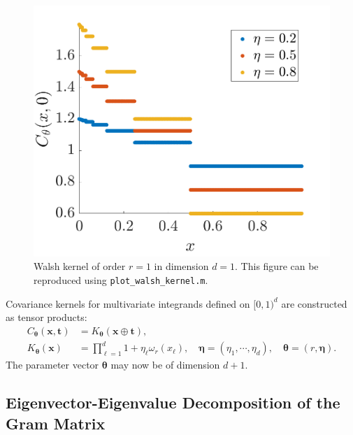 \documentclass[graybox,footinfo]{svmult}
\newcommand{\bm}[1]{\boldsymbol{#1}}
\newcommand{\veta}{{\bm{\eta}}}
\newcommand{\vtheta}{{\bm{\theta}}}
\newcommand{\vt}{\bm{t}}
\newcommand{\vx}{\bm{x}}
\newcommand{\code}[1]{\texttt{#1}}
\newcommand{\JRNote}[1]{{\textcolor{green}{JR: #1}}}
\begin{document}
\begin{figure}
	\centering
	\includegraphics[width=0.9\linewidth]{"figures/walsh_kernel dim_1"}
	\caption[Walsh kernel]{Walsh kernel of order $r=1$ in dimension $d=1$. This figure can be reproduced using \code{plot\_walsh\_kernel.m}. %
	}
	\label{fig:walshkernel-dim1}
\end{figure}

Covariance kernels for multivariate integrands defined on $[0,1)^d$ are constructed as tensor products:
\begin{align}
\label{eqn:digital_shift_in_kernel}
C_{\vtheta}(\vx, \vt) &= K_{\vtheta} (\vx \oplus \vt), \\
\label{eqn:walsh_kernel}
K_{\vtheta} (\vx) & =  
\prod_{\ell=1}^d  1 + \eta_\ell \omega_{r} (x_\ell), \quad \veta = (\eta_1, \cdots, \eta_d), \quad \vtheta = (r, \veta).
\end{align}
The parameter vector $\vtheta$ may now be of dimension $d+1$.

\subsection{Eigenvector-Eigenvalue Decomposition of the Gram Matrix}
\end{document}
